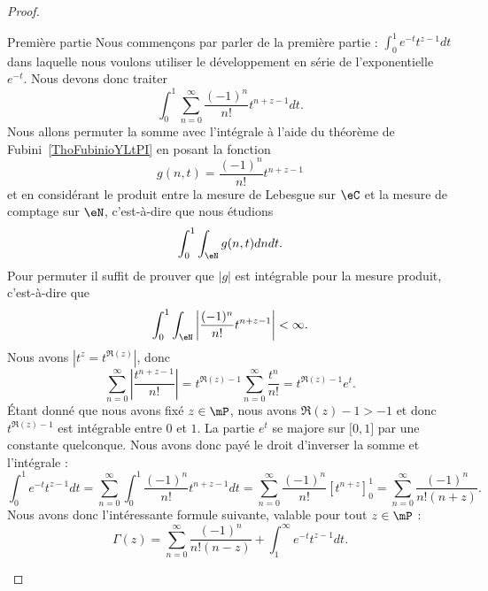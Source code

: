 \begin{proof}
\begin{subproof}
		\item[Première partie] Nous commençons par parler de la première partie : \( \int_0^1 e^{-t}t^{z-1}dt\) dans laquelle nous voulons utiliser le développement en série de l'exponentielle \(  e^{-t}\). Nous devons donc traiter
		\begin{equation}
			\int_0^1\sum_{n=0}^{\infty}\frac{ (-1)^n }{ n! }t^{n+z-1}dt.
		\end{equation}
		Nous allons permuter la somme avec l'intégrale à l'aide du théorème de Fubini~\ref{ThoFubinioYLtPI} en posant la fonction
		\begin{equation}
			g(n,t)=\frac{ (-1)^n }{ n! }t^{n+z-1}
		\end{equation}
		et en considérant le produit entre la mesure de Lebesgue sur \( \eC\) et la mesure de comptage sur \( \eN\), c'est-à-dire que nous étudions
		\begin{equation}
			\int_0^1\int_{\eN}g(n,t)dndt.
		\end{equation}
		Pour permuter il suffit de prouver que \( | g |\) est intégrable pour la mesure produit, c'est-à-dire que
		\begin{equation}
			\int_0^1\int_{\eN}\left| \frac{ (-1)^n }{ n! }t^{n+z-1} \right| <\infty.
		\end{equation}
		Nous avons \( | t^z=t^{\Re(z)} |\), donc
		\begin{equation}
			\sum_{n=0}^{\infty}\left| \frac{ t^{n+z-1} }{ n! } \right| =t^{\Re(z)-1}\sum_{n=0}^{\infty}\frac{ t^n }{ n! }=t^{\Re(z)-1} e^{t}.
		\end{equation}
		Étant donné que nous avons fixé \( z\in\mP\), nous avons \( \Re(z)-1>-1\) et donc \( t^{\Re(z)-1}\) est intégrable entre \( 0\) et \( 1\).
		La partie \(  e^{t}\) se majore sur \( \mathopen[ 0 , 1 \mathclose]\) par une constante quelconque. Nous avons donc payé le droit d'inverser la somme et l'intégrale :
		\begin{equation}
			\int_0^1 e^{-t}t^{z-1}dt=\sum_{n=0}^{\infty}\int_0^1\frac{ (-1)^n }{ n! }t^{n+z-1}dt=\sum_{n=0}^{\infty}\frac{ (-1)^n }{ n! }[t^{n+z}]_0^1=\sum_{n=0}^{\infty}\frac{ (-1)^n }{ n!(n+z) }.
		\end{equation}
		Nous avons donc l'intéressante formule suivante, valable pour tout \( z\in\mP\) :
		\begin{equation}
			\Gamma(z)=\sum_{n=0}^{\infty}\frac{ (-1)^n }{ n!(n-z) }+\int_1^{\infty} e^{-t}t^{z-1}dt.
		\end{equation}


\end{subproof}
\end{proof}
